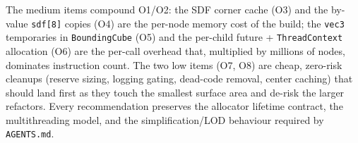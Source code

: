 \documentclass[a4paper,12pt]{article}
\begin{document}
The medium items compound O1/O2: the SDF corner cache (O3) and the by-value
\texttt{sdf[8]} copies (O4) are the per-node memory cost of the build; the
\texttt{vec3} temporaries in \texttt{BoundingCube} (O5) and the per-child
future + \texttt{ThreadContext} allocation (O6) are the per-call overhead that,
multiplied by millions of nodes, dominates instruction count. The two low items (O7,
O8) are cheap, zero-risk cleanups (reserve sizing, logging gating, dead-code
removal, center caching) that should land first as they touch the smallest surface
area and de-risk the larger refactors. Every recommendation preserves the
allocator lifetime contract, the multithreading model, and the
simplification/LOD behaviour required by \texttt{AGENTS.md}.
\end{document}
